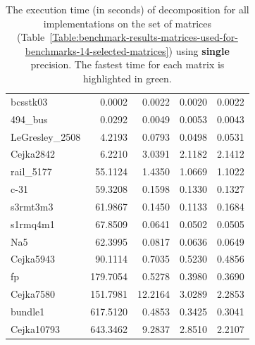 \begin{table}[ht!]
	\centering
	\begin{tabular}{|>{\footnotesize}l|>{\raggedleft\arraybackslash\footnotesize}r|>{\raggedleft\arraybackslash\footnotesize}r|>{\raggedleft\arraybackslash\footnotesize}r|>{\raggedleft\arraybackslash\footnotesize}r|}
		\hline
		\multicolumn{1}{|>{\centering\footnotesize}c|}{Matrix} & \multicolumn{1}{>{\centering\footnotesize}c|}{CM} & \multicolumn{1}{>{\centering\footnotesize}c|}{ICM8} & \multicolumn{1}{>{\centering\footnotesize}c|}{ICM16} & \multicolumn{1}{>{\centering\footnotesize}c|}{ICM32} \\ \hline
		bcsstk03        & \cellcolor{green!25}0.0002 &  0.0022 &                     0.0020 &                     0.0022 \\
		494\_bus 		&                     0.0292 &  0.0049 &                     0.0053 & \cellcolor{green!25}0.0043 \\
		LeGresley\_2508 &                     4.2193 &  0.0793 & \cellcolor{green!25}0.0498 &                     0.0531 \\
		Cejka2842		&                     6.2210 &  3.0391 & \cellcolor{green!25}2.1182 &                     2.1412 \\
		rail\_5177      &                    55.1124 &  1.4350 & \cellcolor{green!25}1.0669 &                     1.1022 \\
		c-31		    &                    59.3208 &  0.1598 &                     0.1330 & \cellcolor{green!25}0.1327 \\
		s3rmt3m3        &                    61.9867 &  0.1450 & \cellcolor{green!25}0.1133 &                     0.1684 \\
		s1rmq4m1        &                    67.8509 &  0.0641 & \cellcolor{green!25}0.0502 &                     0.0505 \\
		Na5             &                    62.3995 &  0.0817 & \cellcolor{green!25}0.0636 &                     0.0649 \\
		Cejka5943		&                    90.1114 &  0.7035 &                     0.5230 & \cellcolor{green!25}0.4856 \\
		fp              &                   179.7054 &  0.5278 &                     0.3980 & \cellcolor{green!25}0.3690 \\
		Cejka7580		&                   151.7981 & 12.2164 &                     3.0289 & \cellcolor{green!25}2.2853 \\
		bundle1         &                   617.5120 &  0.4853 &                     0.3425 & \cellcolor{green!25}0.3041 \\
		Cejka10793      &                   643.3462 &  9.2837 &                     2.8510 & \cellcolor{green!25}2.2107 \\ \hline
	\end{tabular}
	\caption{The execution time (in seconds) of decomposition for all implementations on the set of matrices (Table~\ref{Table:benchmark-results-matrices-used-for-benchmarks-14-selected-matrices}) using \textbf{single} precision. The fastest time for each matrix is highlighted in green.}
	\label{Table:benchmark-results-speedup-comparison-between-CM-and-different-ICMs-execution-times-single-precision}
\end{table}

